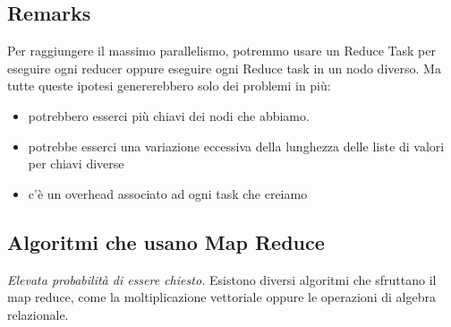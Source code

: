 \subsection{Remarks}
Per raggiungere il massimo parallelismo, potremmo usare un Reduce Task per eseguire ogni reducer oppure eseguire ogni Reduce task in un nodo diverso. Ma tutte queste ipotesi genererebbero solo dei problemi in più: 
\begin{itemize}
    \item potrebbero esserci più chiavi dei nodi che abbiamo. 
    \item potrebbe esserci una variazione eccessiva della lunghezza delle liste di valori per chiavi diverse
    \item c'è un overhead associato ad ogni task che creiamo 
\end{itemize}

\subsection{Algoritmi che usano Map Reduce}
\textit{Elevata probabilità di essere chiesto.} Esistono diversi algoritmi che sfruttano il map reduce, come la moltiplicazione vettoriale oppure le operazioni di algebra relazionale. 

